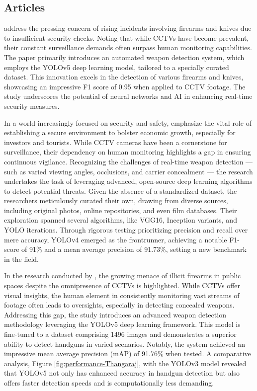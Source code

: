 \subsection{Articles}
\citet{rfc3} address the pressing concern of rising incidents involving firearms and knives due to insufficient security checks. Noting that while CCTVs have become prevalent, their constant surveillance demands often surpass human monitoring capabilities. The paper primarily introduces an automated weapon detection system, which employs the YOLOv5 deep learning model, tailored to a specially curated dataset. This innovation excels in the detection of various firearms and knives, showcasing an impressive F1 score of 0.95 when applied to CCTV footage. The study underscores the potential of neural networks and AI in enhancing real-time security measures.

In a world increasingly focused on security and safety, \citet{rfc4} emphasize the vital role of establishing a secure environment to bolster economic growth, especially for investors and tourists. While CCTV cameras have been a cornerstone for surveillance, their dependency on human monitoring highlights a gap in ensuring continuous vigilance. Recognizing the challenges of real-time weapon detection — such as varied viewing angles, occlusions, and carrier concealment — the research undertakes the task of leveraging advanced, open-source deep learning algorithms to detect potential threats. Given the absence of a standardized dataset, the researchers meticulously curated their own, drawing from diverse sources, including original photos, online repositories, and even film databases. Their exploration spanned several algorithms, like VGG16, Inception variants, and YOLO iterations. Through rigorous testing prioritizing precision and recall over mere accuracy, YOLOv4 emerged as the frontrunner, achieving a notable F1-score of 91\% and a mean average precision of 91.73\%, setting a new benchmark in the field.

In the research conducted by \citet{rfc5}, the growing menace of illicit firearms in public spaces despite the omnipresence of CCTVs is highlighted. While CCTVs offer visual insights, the human element in consistently monitoring vast streams of footage often leads to oversights, especially in detecting concealed weapons. Addressing this gap, the study introduces an advanced weapon detection methodology leveraging the YOLOv5 deep learning framework. This model is fine-tuned to a dataset comprising 1496 images and demonstrates a superior ability to detect handguns in varied scenarios. Notably, the system achieved an impressive mean average precision (mAP) of 91.76\% when tested. A comparative analysis, Figure \ref{fig:performance-Thangaraj}, with the YOLOv3 model revealed that YOLOv5 not only has enhanced accuracy in handgun detection but also offers faster detection speeds and is computationally less demanding.


